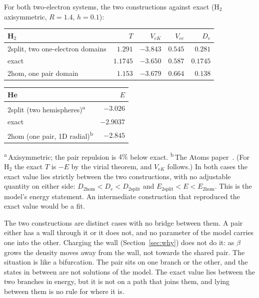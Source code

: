 \documentclass[11pt]{article}
\begin{document}
For both two-electron systems, the two constructions against exact (H$_2$ axisymmetric, $R = 1.4$, $h = 0.1$):
\begin{center}
\small
\begin{tabular}{lrrrr}
\toprule
H$_2$ & $T$ & $V_{eK}$ & $V_{ee}$ & $D_e$ \\
\midrule
2split, two one-electron domains & $1.291$ & $-3.843$ & $0.545$ & $0.281$ \\
exact                            & $1.1745$ & $-3.650$ & $0.587$ & $0.1745$ \\
2hom, one pair domain            & $1.153$ & $-3.679$ & $0.664$ & $0.138$ \\
\bottomrule
\end{tabular}
\qquad
\begin{tabular}{lr}
\toprule
He & $E$ \\
\midrule
2split (two hemispheres)\textsuperscript{a} & $-3.026$ \\
exact                                       & $-2.9037$ \\
2hom (one pair, 1D radial)\textsuperscript{b} & $-2.845$ \\
\bottomrule
\end{tabular}
\end{center}
\noindent\textsuperscript{a}\,Axisymmetric; the pair repulsion is $4\%$ below exact.
\textsuperscript{b}\,The Atoms paper~\cite{atoms}.
(For H$_2$ the exact $T$ is $-E$ by the virial theorem, and $V_{eK}$ follows.) In both cases the
exact value lies strictly between the two constructions, with no adjustable quantity on either side:
$D_{\text{2hom}} < D_e < D_{\text{2split}}$ and $E_{\text{2split}} < E < E_{\text{2hom}}$. This is
the model's energy statement. An intermediate construction that reproduced the exact value would be
a fit.

The two constructions are distinct cases with no bridge between them. A pair either has a wall
through it or it does not, and no parameter of the model carries one into the other. Charging the
wall (Section~\ref{sec:why}) does not do it: as $\beta$ grows the density moves away from the wall,
not towards the shared pair. The situation is like a bifurcation. The pair sits on one branch or
the other, and the states in between are not solutions of the model. The exact value lies between
the two branches in energy, but it is not on a path that joins them, and lying between them is no rule for
where it is.
\end{document}
